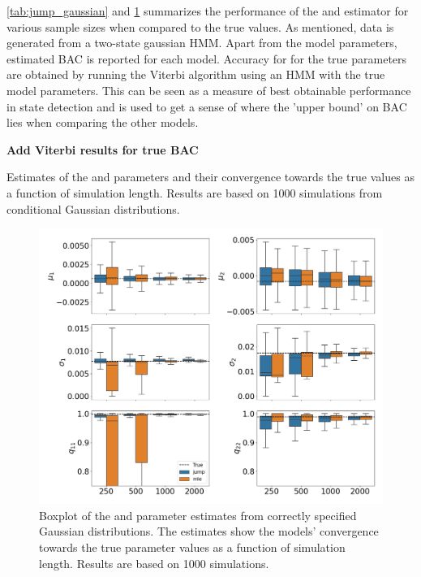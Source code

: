 \cref{tab:jump_gaussian} and \cref{fig:jump_normal_box} summarizes the performance of the \mle and \jump estimator for various sample sizes when compared to the true values. As mentioned, data is generated from a two-state gaussian HMM. Apart from the model parameters, estimated BAC is reported for each model. Accuracy for for the true parameters are obtained by running the Viterbi algorithm using an HMM with the true model parameters. This can be seen as a measure of best obtainable performance in state detection and is used to get a sense of where the 'upper bound' on BAC lies when comparing the other models.

\textbf{Add Viterbi results for true BAC}
\begin{table}[H]
\centering
\caption[Estimates from conditional Gaussian distributions of the \mle and \jump parameters and their convergence towards the true values]{Estimates of the \mle and \jump parameters and their convergence towards the true values as a function of simulation length. Results are based on 1000 simulations from conditional Gaussian distributions.}

\label{tab:jump_gaussian}
\end{table}

\begin{figure}[H] 
    \centering
    \includegraphics[width=1\textwidth]{analysis/model_convergence/images/simulation_normal_box.png}
    \caption[Boxplot of \mle and \jump parameter estimates from correctly specified conditional Gaussian distributions]{Boxplot of the \mle and \jump parameter estimates from correctly specified Gaussian distributions. The estimates show the models' convergence towards the true parameter values as a function of simulation length. Results are based on 1000 simulations.}
    \label{fig:jump_normal_box}
\end{figure}

